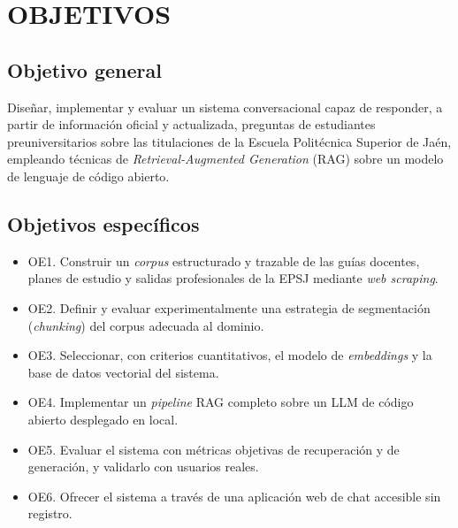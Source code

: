 \chapter{OBJETIVOS}


\section{Objetivo general}

Diseñar, implementar y evaluar un sistema conversacional capaz de responder, a
partir de información oficial y actualizada, preguntas de estudiantes
preuniversitarios sobre las titulaciones de la Escuela Politécnica Superior de
Jaén, empleando técnicas de \textit{Retrieval-Augmented Generation} (RAG) sobre
un modelo de lenguaje de código abierto.

\section{Objetivos específicos}

\begin{itemize}
    \item OE1. Construir un \textit{corpus} estructurado y trazable de las guías
    docentes, planes de estudio y salidas profesionales de la EPSJ mediante
    \textit{web scraping}.
    \item OE2. Definir y evaluar experimentalmente una estrategia de
    segmentación (\textit{chunking}) del corpus adecuada al dominio.
    \item OE3. Seleccionar, con criterios cuantitativos, el modelo de
    \textit{embeddings} y la base de datos vectorial del sistema.
    \item OE4. Implementar un \textit{pipeline} RAG completo sobre un LLM de
    código abierto desplegado en local.
    \item OE5. Evaluar el sistema con métricas objetivas de recuperación y de
    generación, y validarlo con usuarios reales.
    \item OE6. Ofrecer el sistema a través de una aplicación web de chat
    accesible sin registro.
\end{itemize}


